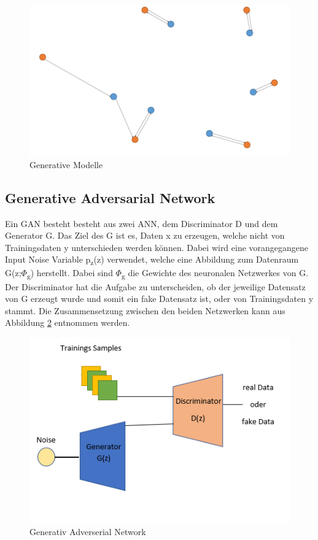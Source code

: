 \documentclass{llncs}
\begin{document}
\begin{figure}[htbp] 
	\centering
	\includegraphics[width=1.0\textwidth]{chamfer.png}
	\caption{Generative Modelle}
	\label{fig:Bild1}
\end{figure}

\subsection{Generative Adversarial Network}

Ein GAN besteht besteht aus zwei ANN, dem Discriminator D und dem Generator G. Das Ziel des G ist es, Daten x zu erzeugen, welche nicht von Trainingsdaten y unterschieden werden können. Dabei wird eine vorangegangene Input Noise Variable p\textsubscript{z}(z) verwendet, welche eine Abbildung zum Datenraum G(z;$\Phi$\textsubscript{g}) herstellt. Dabei sind $\Phi$\textsubscript{g} die Gewichte des neuronalen Netzwerkes von G. Der Discriminator hat die Aufgabe zu unterscheiden, ob der jeweilige Datensatz von G erzeugt wurde und somit ein fake Datensatz ist, oder von Trainingsdaten y stammt\cite{goodfellow2014}. Die Zusammensetzung zwischen den beiden Netzwerken kann aus Abbildung \ref{fig:Bild5} entnommen werden.
\\
\begin{figure}[htbp] 
	\centering
	\includegraphics[width=1.0\textwidth]{GAN_GRUNDAUFBAU.png}
	\caption{Generativ Adverserial Network}
	\label{fig:Bild5}
\end{figure}
\end{document}
